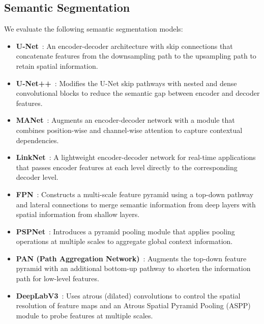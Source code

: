 \subsection{Semantic Segmentation}
We evaluate the following semantic segmentation models:
\label{sec:semantic_segmentation}
\begin{itemize}
	\item \textbf{U-Net}~\cite{ronneberger_u-net_2015}: An encoder-decoder architecture with skip connections that concatenate features from the downsampling path to the upsampling path to retain spatial information.

	\item \textbf{U-Net++}~\cite{zhou_unet_2018}: Modifies the U-Net skip pathways with nested and dense convolutional blocks to reduce the semantic gap between encoder and decoder features.

	\item \textbf{MANet}~\cite{fan_ma-net_2020}: Augments an encoder-decoder network with a module that combines position-wise and channel-wise attention to capture contextual dependencies.

	\item \textbf{LinkNet}~\cite{chaurasia_linknet_2017}: A lightweight encoder-decoder network for real-time applications that passes encoder features at each level directly to the corresponding decoder level.

	\item \textbf{FPN}~\cite{lin_feature_2017}: Constructs a multi-scale feature pyramid using a top-down pathway and lateral connections to merge semantic information from deep layers with spatial information from shallow layers.

	\item \textbf{PSPNet}~\cite{zhao_pyramid_2017}: Introduces a pyramid pooling module that applies pooling operations at multiple scales to aggregate global context information.

	\item \textbf{PAN (Path Aggregation Network)}~\cite{li_pyramid_2018}: Augments the top-down feature pyramid with an additional bottom-up pathway to shorten the information path for low-level features.

	\item \textbf{DeepLabV3}~\cite{chen_rethinking_2017}: Uses atrous (dilated) convolutions to control the spatial resolution of feature maps and an Atrous Spatial Pyramid Pooling (ASPP) module to probe features at multiple scales.


\end{itemize}
